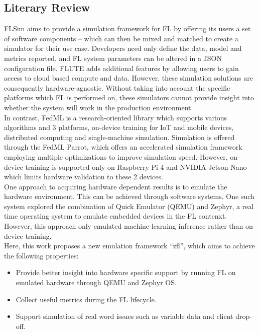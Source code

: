 \documentclass[12pt]{article}
\begin{document}
\subsection{Literary Review}
FLSim\cite{li_2021_flsim} aims to provide a simulation framework for FL by offering its users a set
of software components --
which can then be mixed and matched to create a simulator for their use case. Developers need only
define the data, model and metrics reported, and FL system parameters can be altered in a JSON
configuration file. FLUTE\cite{garcia_2022_flute} adds additional features by allowing users to gain access to cloud based
compute and data. However, these simulation solutions are consequently hardware-agnostic. Without
taking into account the specific platforms which FL is performed on, these simulators cannot provide
insight into whether the system will work in the production environment.\\

In contrast, FedML\cite{he_2020_fedml} is a research-oriented library which supports various algorithms and 3 platforms, on-device training for IoT and
mobile devices, distributed computing and single-machine simulation.
Simulation is offered through the FedML Parrot\cite{tang_2023_fedml}, which offers an accelerated simulation
framework employing multiple optimizations to improve simulation speed.
However, on-device training is supported only on Raspberry Pi 4 and NVIDIA Jetson Nano which limits
hardware validation to these 2 devices.\\

One approach to acquiring hardware dependent results is to emulate the hardware environment. This
can be achieved through software systems. One such system explored the combination of Quick Emulator (QEMU)
and Zephyr, a real time operating system to emulate embedded devices in the FL contenxt\cite{ntu}. However,
this approach only emulated machine learning inference rather than on-device training.\\

Here, this work proposes a new emulation framework ``zfl'', which aims to achieve the following
properties:
\begin{itemize}
  \item Provide better insight into hardware specific support by running FL on emulated hardware
    through QEMU and Zephyr OS.
  \item Collect useful metrics during the FL lifecycle.
  \item Support simulation of real word issues such as variable data and client drop-off.
\end{itemize}
\end{document}
